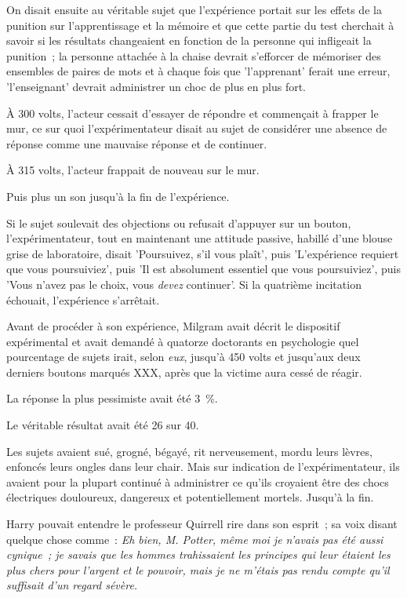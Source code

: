 On disait ensuite au véritable sujet que l'expérience portait sur les effets de la punition sur l'apprentissage et la mémoire et que cette partie du test cherchait à savoir si les résultats changeaient en fonction de la personne qui infligeait la punition~; la personne attachée à la chaise devrait s'efforcer de mémoriser des ensembles de paires de mots et à chaque fois que 'l'apprenant' ferait une erreur, 'l'enseignant' devrait administrer un choc de plus en plus fort.

À 300 volts, l'acteur cessait d'essayer de répondre et commençait à frapper le mur, ce sur quoi l'expérimentateur disait au sujet de considérer une absence de réponse comme une mauvaise réponse et de continuer.

À 315 volts, l'acteur frappait de nouveau sur le mur.

Puis plus un son jusqu'à la fin de l'expérience.

Si le sujet soulevait des objections ou refusait d'appuyer sur un bouton, l'expérimentateur, tout en maintenant une attitude passive, habillé d'une blouse grise de laboratoire, disait 'Poursuivez, s'il vous plaît', puis 'L'expérience requiert que vous poursuiviez', puis 'Il est absolument essentiel que vous poursuiviez', puis 'Vous n'avez pas le choix, vous \emph{devez} continuer'. Si la quatrième incitation échouait, l'expérience s'arrêtait.

Avant de procéder à son expérience, Milgram avait décrit le dispositif expérimental et avait demandé à quatorze doctorants en psychologie quel pourcentage de sujets irait, selon \emph{eux}, jusqu'à 450 volts et jusqu'aux deux derniers boutons marqués XXX, après que la victime aura cessé de réagir.

La réponse la plus pessimiste avait été 3~\%.

Le véritable résultat avait été 26 sur 40.

Les sujets avaient sué, grogné, bégayé, rit nerveusement, mordu leurs lèvres, enfoncés leurs ongles dans leur chair. Mais sur indication de l'expérimentateur, ils avaient pour la plupart continué à administrer ce qu'ils croyaient être des chocs électriques douloureux, dangereux et potentiellement mortels. Jusqu'à la fin.

Harry pouvait entendre le professeur Quirrell rire dans son esprit~; sa voix disant quelque chose comme~: \emph{Eh bien, M. Potter, même moi je n'avais pas été aussi cynique~; je savais que les hommes trahissaient les principes qui leur étaient les plus chers pour l'argent et le pouvoir, mais je ne m'étais pas rendu compte qu'il suffisait d'un regard sévère.}

